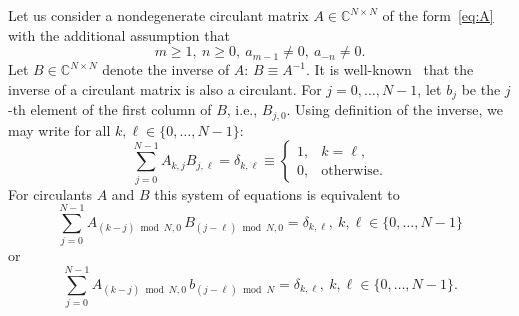 \documentclass[a4paper]{article}
\begin{document}
	Let us consider a nondegenerate circulant matrix $A \in \mathbb{C}^{N\times N}$ of the form~\eqref{eq:A} with the additional assumption that
	\[
	m \ge 1,~n \ge 0,~a_{m-1} \neq 0,~a_{-n} \neq 0.
	\]
	Let $B \in \mathbb{C}^{N \times N}$ denote the inverse of $A$: $B \equiv A^{-1}$.
	It is well-known~\cite{tyrtyshnikov1997brief} that the inverse of a circulant matrix is also a circulant.
	For $j = 0, \dots, N-1$, let $b_{j}$ be the $j$-th element of the first column of $B$, i.e., $B_{j, 0}$.
	Using definition of the inverse, we may write for all $k,\ell \in \{0,\dots,N-1\}$:
	\[
	\sum_{j=0}^{N-1} A_{k, j}B_{j,\ell}
	=
	\delta_{k,\ell}
	\equiv
	\begin{cases}
		1, &k=\ell, \\
		0, &\text{otherwise}.
	\end{cases}
	\]
	For circulants $A$ and $B$ this system of equations is equivalent to 
	\[
	\sum_{j=0}^{N-1} A_{(k-j) \bmod N, 0}\, B_{(j-\ell)\bmod N, 0}
	=
	\delta_{k,\ell},~k,\ell \in \{0,\dots, N-1\}
	\]
	or 
	\begin{equation}\label{eq:inverse}
	    \sum_{j=0}^{N-1} A_{(k-j) \bmod N, 0}\,b_{(j-\ell)\bmod N}
	=
	\delta_{k,\ell},
	~k,\ell \in \{0,\dots,N-1\}.
	\end{equation}
	
\end{document}
